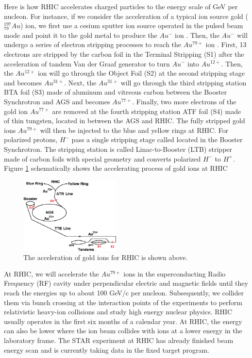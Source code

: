 Here is how RHIC accelerates charged particles to the energy scale of GeV per nucleon. For instance, if we consider the acceleration of a typical ion source gold (${}^{197}_{79}Au$) ion, we first use a cesium sputter ion source operated in the pulsed beam mode and point it to the gold metal to produce the $Au^-$ ion \cite{FirstAuSource}. Then, the $Au^{-}$ will undergo a series of electron stripping processes to reach the $Au^{79+}$ ion \cite{RHICStrpDetail}. First, 13 electrons are stripped by the carbon foil in the Terminal Stripping (S1) after the acceleration of tandem Van der Graaf generator to turn $Au^{-}$ into $Au^{12+}$. Then, the $Au^{12+}$ ion will go through the Object Foil (S2) at the second stripping stage and becomes $Au^{31+}$. Next, the $Au^{31+}$ will go through the third stripping station BTA foil (S3) made of aluminum and vitreous carbon between the Booster Synchrotron and AGS and becomes $Au^{77+}$. Finally, two more electrons of the gold ion $Au^{77+}$ are removed at the fourth stripping station ATF foil (S4) made of thin tungsten, located in between the AGS and RHIC. The fully stripped gold ions $Au^{79+}$ will then be injected to the blue and yellow rings at RHIC. For polarized protons, $H^-$ pass a single stripping stage called located in the Booster Synchrotron. The stripping station is called Linac-to-Booster (LTB) stripper made of carbon foils with special geometry and converts polarized $H^-$ to $H^+$. Figure \ref{AccAu} schematically shows the accelerating process of gold ions at RHIC \cite{AuStripRef}

\begin{figure}[hbtp]
\begin{center}
\includegraphics[width=0.45\textwidth]{Figures/Chapter1/AccAu.png}
\caption{The acceleration of gold ions for RHIC is shown above.}
\label{AccAu}
\end{center}
\end{figure} 

At RHIC, we will accelerate the $Au^{79+}$ ions in the superconducting Radio Frequency (RF) cavity under perpendicular electric and magnetic fields until they reach the energies up to about 100 GeV/c per nucleon. Subsequently, we collider them via bunch crossing at the interaction points of the experiments to perform relativistic heavy-ion collisions and study high energy nuclear physics. RHIC usually operates in the first six months of a calendar year. At RHIC, the energy can also be lower where the ion beam collides with ions at a lower energy in the laboratory frame. The STAR experiment at RHIC has already finished beam energy scan and is currently taking data in the fixed target program. 

